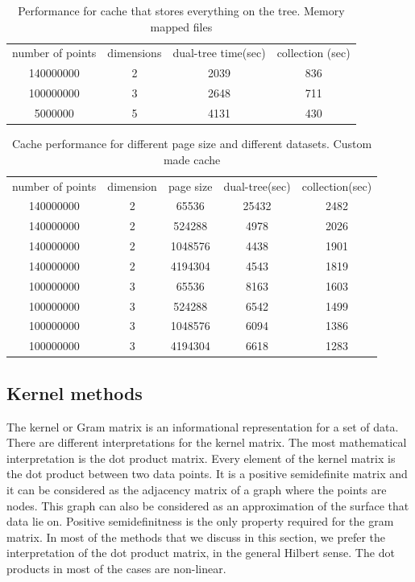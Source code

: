 \documentclass[12pt,letterpaper,doublespaced,ETD,dvips,proposal]{gtthesis}
\begin{document}
\begin{Body}
\begin{table}[!htb]
\label{on_the_leaf}
\footnotesize{ \centering
\begin{tabular}{|c|c|c|c|}
  \hline
  number of points & dimensions & dual-tree time(sec) & collection (sec)\\
  140000000 & 2 & 2039 & 836\\
  100000000 & 3 & 2648 & 711\\
  5000000   & 5 & 4131 & 430\\
  \hline
\end{tabular}
\caption{Performance for cache that stores everything on the tree. Memory mapped files}
}
\end{table}

\begin{table}[!htb]
\label{mmanager_comparison}
\footnotesize{ \centering
\begin{tabular}{|c|c|c|c|c|}
  \hline
   number of points & dimension & page size & dual-tree(sec) & collection(sec) \\
   140000000 & 2 & 65536   & 25432 & 2482 \\
   140000000 & 2 & 524288  & 4978  & 2026 \\
   140000000 & 2 & 1048576 & 4438  & 1901 \\
   140000000 & 2 & 4194304 & 4543  & 1819 \\
   100000000 & 3 & 65536   & 8163  & 1603 \\
   100000000 & 3 & 524288  & 6542  & 1499 \\
   100000000 & 3 & 1048576 & 6094  & 1386 \\
   100000000 & 3 & 4194304 & 6618  & 1283 \\
 \hline
\end{tabular}
\caption{Cache performance for different page size and different datasets. Custom made cache}
}
\end{table}


\subsection{Kernel methods}
\label{Kernel_methods}

The kernel or Gram matrix is an informational representation
for a set of data. There are  different interpretations for the
kernel matrix. The most mathematical interpretation is the dot
product matrix. Every element of the kernel matrix is the dot
product between two data points. It is a positive semidefinite
matrix and it can be considered as the adjacency matrix of a graph
where the points are nodes. This graph can also be considered as an
approximation of the surface that data lie on. Positive
semidefinitness is the only property required for the gram matrix.
In most of the methods that we discuss in this section, we prefer
the interpretation of the dot product matrix, in the general Hilbert
sense. The dot products in most of the cases are non-linear.


\end{Body}
\end{document}
